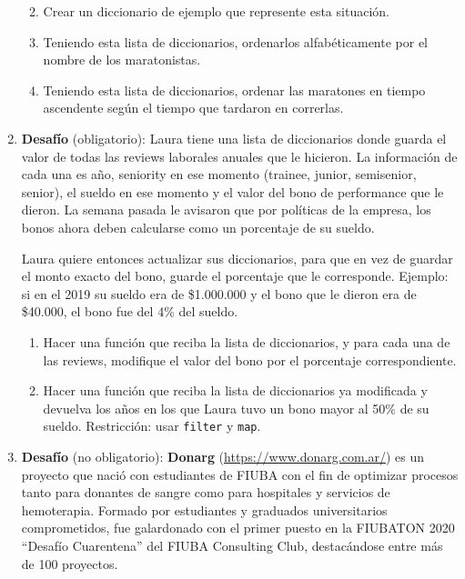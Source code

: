 \documentclass[
  letterpaper,
  DIV=11,
  numbers=noendperiod]{scrreprt}
\providecommand{\tightlist}{%
  \setlength{\itemsep}{0pt}\setlength{\parskip}{0pt}}\usepackage{longtable,booktabs,array}
\begin{document}
\begin{enumerate}
  \begin{enumerate}
  \def\labelenumii{\alph{enumii}.}
  \tightlist
  \item
    Crear un diccionario de ejemplo que represente esta situación.
  \item
    Teniendo esta lista de diccionarios, ordenarlos alfabéticamente por
    el nombre de los maratonistas.
  \item
    Teniendo esta lista de diccionarios, ordenar las maratones en tiempo
    ascendente según el tiempo que tardaron en correrlas.
  \end{enumerate}
\item
  \textbf{Desafío} (obligatorio): Laura tiene una lista de diccionarios
  donde guarda el valor de todas las reviews laborales anuales que le
  hicieron. La información de cada una es año, seniority en ese momento
  (trainee, junior, semisenior, senior), el sueldo en ese momento y el
  valor del bono de performance que le dieron. La semana pasada le
  avisaron que por políticas de la empresa, los bonos ahora deben
  calcularse como un porcentaje de su sueldo.

  Laura quiere entonces actualizar sus diccionarios, para que en vez de
  guardar el monto exacto del bono, guarde el porcentaje que le
  corresponde. Ejemplo: si en el 2019 su sueldo era de \$1.000.000 y el
  bono que le dieron era de \$40.000, el bono fue del 4\% del sueldo.

  \begin{enumerate}
  \def\labelenumii{\alph{enumii}.}
  \item
    Hacer una función que reciba la lista de diccionarios, y para cada
    una de las reviews, modifique el valor del bono por el porcentaje
    correspondiente.
  \item
    Hacer una función que reciba la lista de diccionarios ya modificada
    y devuelva los años en los que Laura tuvo un bono mayor al 50\% de
    su sueldo. Restricción: usar \texttt{filter} y \texttt{map}.
  \end{enumerate}
\item
  \textbf{Desafío} (no obligatorio): \textbf{Donarg}
  (\url{https://www.donarg.com.ar/}) es un proyecto que nació con
  estudiantes de FIUBA con el fin de optimizar procesos tanto para
  donantes de sangre como para hospitales y servicios de hemoterapia.
  Formado por estudiantes y graduados universitarios comprometidos, fue
  galardonado con el primer puesto en la FIUBATON 2020 ``Desafío
  Cuarentena'' del FIUBA Consulting Club, destacándose entre más de 100
  proyectos.


\end{enumerate}
\end{document}
